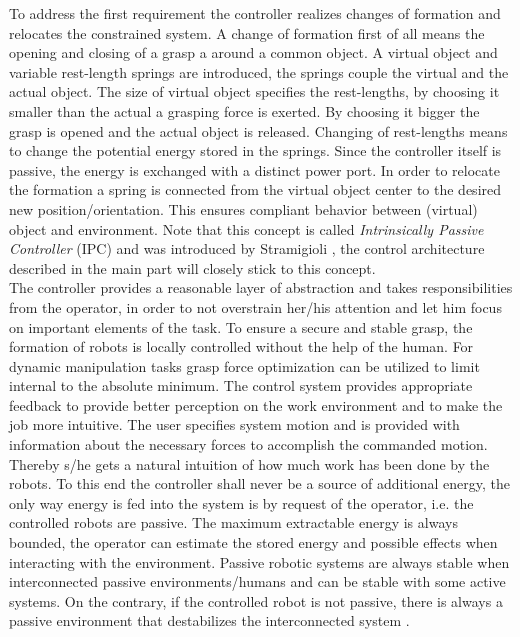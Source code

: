 \documentclass[a4paper,twoside, openright,12pt]{report}
\begin{document}
To address the first requirement the controller realizes changes of formation and relocates the constrained system. A change of formation first of all means the opening and closing of a grasp a around a common object. A virtual object and variable rest-length springs are introduced, the springs couple the virtual and the actual object. The size of virtual object specifies the rest-lengths, by choosing it smaller than the actual a grasping force is exerted. By choosing it bigger the grasp is opened and the actual object is released. Changing of rest-lengths means to change the potential energy stored in the springs. Since the controller itself is passive, the energy is exchanged with a distinct power port. In order to relocate the formation a spring is connected from the virtual object center to the desired new position/orientation. This ensures compliant behavior between (virtual) object and environment. Note that this concept is called \emph{Intrinsically Passive Controller} (IPC) and was introduced by Stramigioli \cite{Stramigioli_01}, the control architecture described in the main part will closely stick to this concept. \\
The controller provides a reasonable layer of abstraction and takes responsibilities from the operator, in order to not overstrain her/his attention and let him focus on important elements of the task. To ensure a secure and stable grasp, the formation of robots is locally controlled without the help of the human. For dynamic manipulation tasks grasp force optimization can be utilized to limit internal to the absolute minimum. The control system provides appropriate feedback to provide better perception on the work environment and to make the job more intuitive. The user specifies system motion and is provided with information about the necessary forces to accomplish the commanded motion. Thereby s/he gets a natural intuition of how much work has been done by the robots. To this end the controller shall never be a source of additional energy, the only way energy is fed into the system is by request of the operator, i.e. the controlled robots are passive. The maximum extractable energy is always bounded, the operator can estimate the stored energy and possible effects when interacting with the environment. Passive robotic systems are always stable when interconnected passive environments/humans and can be stable with some active systems. On the contrary, if the controlled robot is not passive, there is always a passive environment that destabilizes the interconnected system \cite{Stramigioli_15}.
\end{document}
